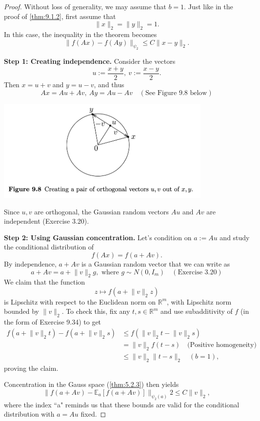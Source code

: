 \begin{proof}
Without loss of generality, we may assume that $b = 1$. Just like in the proof of \cref{thm:9.1.2}, first assume 
that 
\[ \lVert x \rVert_{2} = \lVert y \rVert_{2} = 1. \]
In this case, the inequality in the theorem becomes 
\[ \lVert f(Ax) - f(Ay) \rVert_{\psi_2} \leq C \lVert x - y \rVert_{2}. \]

\textbf{Step 1: Creating independence.} Consider the vectors 
\[ u := \frac{x + y}{2}, \ v := \frac{x - y}{2}. \]
Then $x = u + v$ and $y = u - v$, and thus 
\[ Ax = Au + Av, \ Ay = Au - Av \quad (\text{See Figure 9.8 below}) \]
\begin{center}
	\includegraphics[width=0.8\textwidth]{Chapter 9/fig9-8.png}
\end{center}
Since $u, v$ are orthogonal, the Gaussian random vectors $Au$ and $Av$ are independent (Exercise 3.20).

\textbf{Step 2: Using Gaussian concentration.} Let's condition on $a := Au$ and study the conditional 
distribution of 
\[ f(Ax) = f(a + Av). \]
By independence, $a + Av$ is a Gaussian random vector that we can write as 
\[ a + Av = a + \lVert v \rVert_{2}g, \text{ where } g \sim N(0, I_m) \quad (\text{Exercise 3.20}) \]
We claim that the function 
\[ z \mapsto f(a + \lVert v \rVert_{2}z) \]
is Lipschitz with respect to the Euclidean norm on $\mathbb{R}^m$, with Lipschitz norm bounded by $\lVert v
\rVert_{2}$. To check this, fix any $t, s \in \mathbb{R}^m$ and use subadditivity of $f$ (in the form of 
Exercise 9.34) to get 
\begin{align*}
	f(a + \lVert v \rVert_{2}t) - f(a + \lVert v \rVert_{2}s) 
	&\leq f(\lVert v \rVert_{2}t - \lVert v \rVert_{2}s) \\
	&= \lVert v \rVert_{2} f(t - s) \quad \text{(Positive homogeneity)} \\
	&\leq \lVert v \rVert_{2} \lVert t - s \rVert_{2} \quad (b = 1),
\end{align*}
proving the claim.

Concentration in the Gauss space (\cref{thm:5.2.3}) then yields 
\[ \lVert f(a + Av) - \mathbb{E}_a\left[ f(a + Av) \right] \rVert_{\psi_2(a)}2 \leq C \lVert v \rVert_{2}, \]
where the index ``a" reminds us that these bounds are valid for the conditional distribution with $a = Au$ fixed.


\end{proof}
